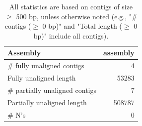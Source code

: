 \documentclass[12pt,a4paper]{article}
\begin{document}
\begin{table}[ht]
\begin{center}
\caption{All statistics are based on contigs of size $\geq$ 500 bp, unless otherwise noted (e.g., "\# contigs ($\geq$ 0 bp)" and "Total length ($\geq$ 0 bp)" include all contigs).}
\begin{tabular}{|l*{1}{|r}|}
\hline
Assembly & assembly \\ \hline
\# fully unaligned contigs & 4 \\ \hline
Fully unaligned length & 53283 \\ \hline
\# partially unaligned contigs & 7 \\ \hline
Partially unaligned length & 508787 \\ \hline
\# N's & 0 \\ \hline
\end{tabular}
\end{center}
\end{table}
\end{document}

